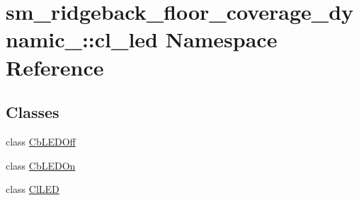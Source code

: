 \hypertarget{namespacesm__ridgeback__floor__coverage__dynamic__1_1_1cl__led}{}\section{sm\+\_\+ridgeback\+\_\+floor\+\_\+coverage\+\_\+dynamic\+\_\+:\+:cl\+\_\+led Namespace Reference}
\label{namespacesm__ridgeback__floor__coverage__dynamic__1_1_1cl__led}
\subsection*{Classes}
\begin{DoxyCompactItemize}
\item 
class \hyperlink{classsm__ridgeback__floor__coverage__dynamic__1_1_1cl__led_1_1CbLEDOff}{Cb\+L\+E\+D\+Off}
\item 
class \hyperlink{classsm__ridgeback__floor__coverage__dynamic__1_1_1cl__led_1_1CbLEDOn}{Cb\+L\+E\+D\+On}
\item 
class \hyperlink{classsm__ridgeback__floor__coverage__dynamic__1_1_1cl__led_1_1ClLED}{Cl\+L\+ED}
\end{DoxyCompactItemize}
